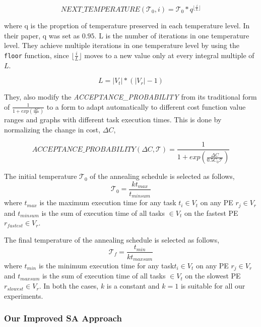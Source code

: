 \begin{equation}
\textit{NEXT\_TEMPERATURE}(\mathcal{T}_0, i) = \mathcal{T}_0*q^{\lfloor
\frac{i}{L} \rfloor}
\end{equation}

where q is the proprtion of temperature preserved in each temperature level. In
their paper, q was set as $0.95$. L is the number of iterations in one
temperature level. They achieve multiple iterations in one temperature level by
using the \texttt{floor} function, since $\lfloor \frac{i}{L} \rfloor$ moves to
a new value only at every integral multiple of $L$.

\begin{equation}
L = |V_t|*(|V_r| - 1)
\end{equation}

They, also modify the \textit{ACCEPTANCE\_PROBABILITY} from its traditional form
of $\frac{1}{1+exp(\frac{\Delta C}{\mathcal{T}})}$ to a form to adapt
automatically to different cost function value ranges and graphs with different
task execution times. This is done by normalizing the change in cost, $\Delta
C$,

\begin{equation}
ACCEPTANCE\_PROBABILITY(\Delta C, \mathcal{T}) = \frac{1}{1+exp(\frac{\Delta
C}{0.5C_0\mathcal{T}})}
\end{equation}

The initial temperature $\mathcal{T}_0$ of the annealing schedule is selected as
follows,
\begin{equation}
\mathcal{T}_0 = \frac{kt_{max}}{t_{minsum}}
\end{equation}
where $t_{max}$ is the maximum execution time for any task $t_i \in V_t$ on any
PE $r_j \in V_r$ and $t_{minsum}$ is the sum of execution time of all tasks $\in
V_t$ on the fastest PE $r_{fastest} \in V_r$.

The final temperature of the annealing schedule is selected as follows,
\begin{equation}
\mathcal{T}_f = \frac{t_{min}}{kt_{maxsum}}
\end{equation}
where $t_{min}$ is the minimum execution time for any task$t_i \in V_t$ on any
PE $r_j \in V_r$ and $t_{maxsum}$ is the sum of execution time of all tasks $\in
V_t$ on the slowest PE $r_{slowest} \in V_r$. In both the cases, $k$ is a
constant and $k=1$ is suitable for all our experiments.

\subsubsection{Our Improved SA Approach}

